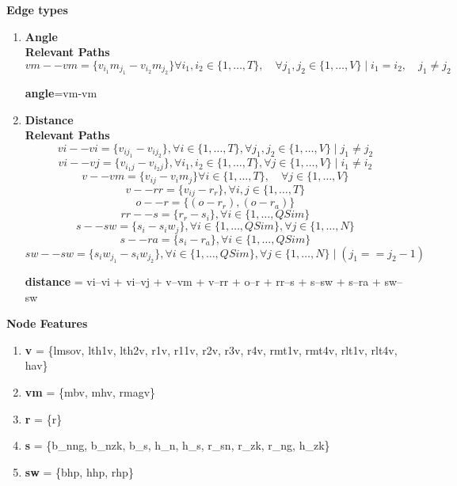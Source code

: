 \documentclass[a4paper,12pt]{article}
\begin{document}
\textbf{Edge types}

\begin{enumerate}
    \item \textbf{Angle} \\
    \textbf{Relevant Paths}
    \[
    vm--vm = \{ v_{i_{1}}m_{j_{1}} - v_{i_{2}}m_{j_{2}} \}
    \forall i_1, i_2 \in \{1, \dots, T\}, \quad \forall j_1, j_2 \in \{1, \dots, V\} \mid
    i_1 = i_2, \quad j_1 \neq j_2
    \]

    \textbf{angle}=vm-vm

    \item \textbf{Distance} \\
    \textbf{Relevant Paths}
    \[
        vi--vi = \{v_{i j_1} - v_{i j_2}\}, \forall i \in \{1, \dots, T\}, \forall j_1, j_2 \in \{1, \dots, V\} \mid  j_1 \neq j_2
    \]
    \[
        vi--vj = \{v_{i_1 j} - v_{i_2 j}\}, \forall i_1, i_2 \in \{1, \dots, T\}, \forall j \in \{1, \dots, V\} \mid  i_1 \neq i_2
    \]
    \[
        v--vm = \{v_{i j} - v_{i}m_{j}\} \forall i  \in \{1, \dots, T\}, \quad \forall j \in \{1, \dots, V\}
    \]
    \[
        v--rr = \{v_{i j} - r_{r}\}, \forall i, j  \in \{1, \dots, T\}
    \]
    \[
        o--r = \{ (o - r_{r}), (o - r_{a})\}
    \]
    \[
        rr--s = \{r_{r} - s_{i}\}, \forall i  \in \{1, \dots, QSim\}
    \]
    \[
        s--sw = \{s_{i} - s_{i}w_{j}\}, \forall i  \in \{1, \dots, QSim\}, \forall j  \in \{1, \dots, N\}
    \]
    \[
        s--ra = \{s_{i} - r_{a}\}, \forall i  \in \{1, \dots, QSim\}
    \]
    \[
        sw--sw = \{s_{i}w_{j_1} - s_{i}w_{j_2}\}, \forall i  \in \{1, \dots, QSim\}, \forall j  \in \{1, \dots, N\} \mid (j_1 == j_2-1)
    \]

    \textbf{distance} = vi--vi + vi--vj + v--vm + v--rr + o--r + rr--s + s--sw + s--ra + sw--sw

\end{enumerate}

\textbf{Node Features}

\begin{enumerate}

    \item \textbf{v} = \{lmsov, lth1v, lth2v, r1v, r11v, r2v, r3v, r4v, rmt1v, rmt4v, rlt1v, rlt4v, hav\}

    \item \textbf{vm} = \{mbv, mhv, rmagv\}

    \item \textbf{r} = \{r\}

    \item \textbf{s} = \{b\_nng, b\_nzk, b\_s, h\_n, h\_s, r\_sn, r\_zk, r\_ng, h\_zk\}

    \item \textbf{sw} = \{bhp, hhp, rhp\}
\end{enumerate}
\end{document}
